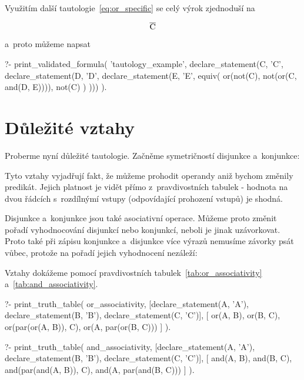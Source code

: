 Využitím další tautologie~\eqref{eq:or_specific} se celý výrok zjednoduší na

\begin{equation}
\overline{\mathrm{C}}
\end{equation}

a~proto můžeme napsat

\begin{prolog}
?- print_validated_formula(
	'tautology_example',
	declare_statement(C, 'C', declare_statement(D, 'D', declare_statement(E, 'E',
		equiv(
			or(not(C), not(or(C, and(D, E)))),
			not(C)
		)
	)))
).
\end{prolog}

\section{Důležité vztahy}

Proberme nyní důležité tautologie. Začněme symetričností disjunkce a~konjunkce:


Tyto vztahy vyjadřují fakt, že můžeme prohodit operandy aniž bychom změnily predikát. Jejich platnost je vidět přímo z~pravdivostních tabulek - hodnota na dvou řádcích s~rozdílnýmí vstupy (odpovídající prohození vstupů) je shodná.

Disjunkce a~konjunkce jsou také asociativní operace. Můžeme proto změnit pořadí vyhodnocování disjunkcí nebo konjunkcí, neboli je jinak uzávorkovat. Proto také při zápisu konjunkce a~disjunkce více výrazů nemusíme závorky psát vůbec, protože na pořadí jejich vyhodnocení nezáleží:


Vztahy dokážeme pomocí pravdivostních tabulek~\ref{tab:or_associativity} a~\ref{tab:and_associativity}.

\begin{prolog}
?- print_truth_table(
	or_associativity,
	[declare_statement(A, 'A'), declare_statement(B, 'B'), declare_statement(C, 'C')],
	[
		or(A, B),
		or(B, C),
		or(par(or(A, B)), C),
		or(A, par(or(B, C)))
	]
).
\end{prolog}

\begin{prolog}
?- print_truth_table(
	and_associativity,
	[declare_statement(A, 'A'), declare_statement(B, 'B'), declare_statement(C, 'C')],
	[
		and(A, B),
		and(B, C),
		and(par(and(A, B)), C),
		and(A, par(and(B, C)))
	]
).
\end{prolog}

